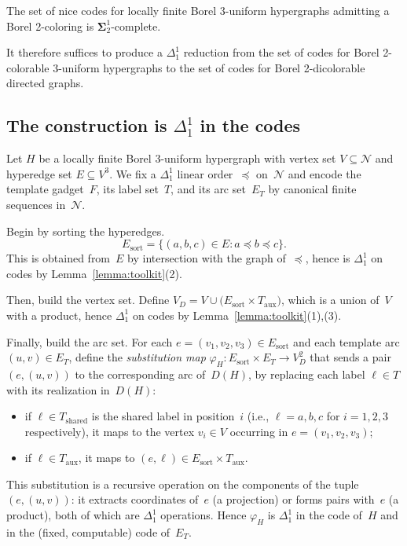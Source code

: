 \documentclass[12pt]{article}
\newcommand{\NN}{\mathcal{N}}
\begin{document}
\begin{fact}\label{fact:hyp-borel}
The set of nice codes for locally finite Borel 3-uniform hypergraphs admitting a Borel 2-coloring is $\mathbf\Sigma^1_2$-complete.
\end{fact}

It therefore suffices to produce a $\Delta^1_1$ reduction from the set of codes for Borel 2-colorable 3-uniform hypergraphs to the set of codes for Borel 2-dicolorable directed graphs.

\subsection{The construction is \texorpdfstring{$\Delta^1_1$}{delta-one-one} in the codes}

Let $H$ be a locally finite Borel 3-uniform hypergraph with vertex set $V\subseteq\NN$ and hyperedge set $E\subseteq V^3$.
We fix a $\Delta^1_1$ linear order~$\preceq$ on~$\NN$ and encode the template gadget~$F$, its label set~$T$, and its arc set~$E_T$ by canonical finite sequences in~$\NN$.

Begin by sorting the hyperedges.
$$E_{\mathrm{sort}} = \{(a,b,c)\in E : a\preceq b\preceq c\}.$$
This is obtained from~$E$ by intersection with the graph of~$\preceq$, hence is $\Delta^1_1$ on codes by Lemma~\ref{lemma:toolkit}(2).

Then, build the vertex set.
Define $V_D = V \cup \bigl(E_{\mathrm{sort}}\times T_{\mathrm{aux}}\bigr)$, which is a union of~$V$ with a product, hence $\Delta^1_1$ on codes by Lemma~\ref{lemma:toolkit}(1),(3).

Finally, build the arc set.
For each $e = (v_1,v_2,v_3)\in E_{\mathrm{sort}}$ and each template arc $(u,v)\in E_T$, define the \emph{substitution map} $\varphi_H\colon E_{\mathrm{sort}}\times E_T\to V_D^2$ that sends a pair $(e,(u,v))$ to the corresponding arc of~$D(H)$, by replacing each label $\ell\in T$ with its realization in~$D(H)$:
\begin{itemize}[nosep]
	\item if $\ell\in T_{\mathrm{shared}}$ is the shared label in position~$i$ (i.e., $\ell = a,b,c$ for $i=1,2,3$ respectively), it maps to the vertex $v_i\in V$ occurring in $e=(v_1,v_2,v_3)$;
	\item if $\ell\in T_{\mathrm{aux}}$, it maps to $(e,\ell)\in E_{\mathrm{sort}}\times T_{\mathrm{aux}}$.
\end{itemize}
This substitution is a recursive operation on the components of the tuple $(e,(u,v))$: it extracts coordinates of~$e$ (a projection) or forms pairs with~$e$ (a product), both of which are $\Delta^1_1$ operations.
Hence $\varphi_H$ is $\Delta^1_1$ in the code of~$H$ and in the (fixed, computable) code of~$E_T$.
\end{document}
